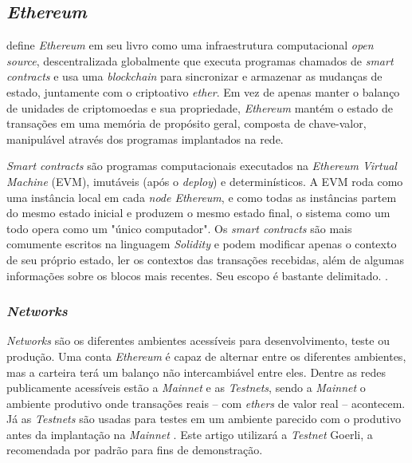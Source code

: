 {\subsection{\esp \textit{Ethereum}} \label{ethereum}
 define \textit{Ethereum} em seu livro como uma infraestrutura computacional \textit{open source}, descentralizada globalmente que executa programas chamados de \textit{smart contracts} e usa uma \textit{blockchain} para sincronizar e armazenar as mudanças de estado, juntamente com o criptoativo \textit{ether}. Em vez de apenas manter o balanço de unidades de criptomoedas e sua propriedade, \textit{Ethereum} mantém o estado de transações em uma memória de propósito geral, composta de chave-valor, manipulável através dos programas implantados na rede.

\textit{Smart contracts} são programas computacionais executados na \textit{Ethereum Virtual Machine} (EVM), imutáveis (após o \textit{deploy}) e determinísticos. A EVM roda como uma instância local em cada \textit{node Ethereum}, e como todas as instâncias partem do mesmo estado inicial e produzem o mesmo estado final, o sistema como um todo opera como um "único computador". Os \textit{smart contracts} são mais comumente escritos na linguagem \textit{Solidity} e podem modificar apenas o contexto de seu próprio estado, ler os contextos das transações recebidas, além de algumas informações sobre os blocos mais recentes. Seu escopo é bastante delimitado. \cite{antonopoulos2018mastering}.

\subsubsection{\esp \textit{Networks}} \label{networks}
\textit{Networks} são os diferentes ambientes acessíveis para desenvolvimento, teste ou produção. Uma conta \textit{Ethereum} é capaz de alternar entre os diferentes ambientes, mas a carteira terá um balanço não intercambiável entre eles. Dentre as redes publicamente acessíveis estão a \textit{Mainnet} e as \textit{Testnets}, sendo a \textit{Mainnet} o ambiente produtivo onde transações reais -- com \textit{ethers} de valor real -- acontecem. Já as \textit{Testnets} são usadas para testes em um ambiente parecido com o produtivo antes da implantação na \textit{Mainnet} \cite{ethereumorgnetworks}. Este artigo utilizará a \textit{Testnet} Goerli, a recomendada por padrão para fins de demonstração.

}
